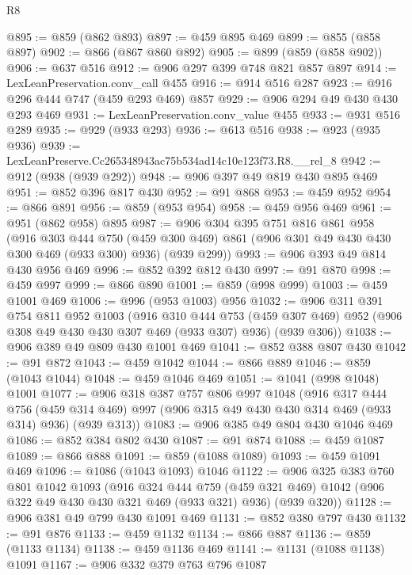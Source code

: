 \begin{lexlean}{R8}
\begin{coremodule}
@895 := @859 (@862 @893)
@897 := @459 @895 @469
@899 := @855 (@858 @897)
@902 := @866 (@867 @860 @892)
@905 := @899 (@859 (@858 @902))
@906 := @637 @516
@912 := @906 @297 @399 @748 @821 @857 @897
@914 := LexLeanPreservation.conv_call @455
@916 := @914 @516 @287
@923 := @916 @296 @444 @747 (@459 @293 @469) @857
@929 := @906 @294 @49 @430 @430 @293 @469
@931 := LexLeanPreservation.conv_value @455
@933 := @931 @516 @289
@935 := @929 (@933 @293)
@936 := @613 @516
@938 := @923 (@935 @936)
@939 := LexLeanPreserve.Cc265348943ac75b534ad14c10e123f73.R8.__rel_8
@942 := @912 (@938 (@939 @292))
@948 := @906 @397 @49 @819 @430 @895 @469
@951 := @852 @396 @817 @430
@952 := @91 @868
@953 := @459 @952
@954 := @866 @891
@956 := @859 (@953 @954)
@958 := @459 @956 @469
@961 := @951 (@862 @958) @895
@987 := @906
    @304
    @395
    @751
    @816
    @861
    @958
    (@916
      @303
      @444
      @750
      (@459 @300 @469)
      @861
      (@906 @301 @49 @430 @430 @300 @469 (@933 @300) @936)
      (@939 @299))
@993 := @906 @393 @49 @814 @430 @956 @469
@996 := @852 @392 @812 @430
@997 := @91 @870
@998 := @459 @997
@999 := @866 @890
@1001 := @859 (@998 @999)
@1003 := @459 @1001 @469
@1006 := @996 (@953 @1003) @956
@1032 := @906
    @311
    @391
    @754
    @811
    @952
    @1003
    (@916
      @310
      @444
      @753
      (@459 @307 @469)
      @952
      (@906 @308 @49 @430 @430 @307 @469 (@933 @307) @936)
      (@939 @306))
@1038 := @906 @389 @49 @809 @430 @1001 @469
@1041 := @852 @388 @807 @430
@1042 := @91 @872
@1043 := @459 @1042
@1044 := @866 @889
@1046 := @859 (@1043 @1044)
@1048 := @459 @1046 @469
@1051 := @1041 (@998 @1048) @1001
@1077 := @906
    @318
    @387
    @757
    @806
    @997
    @1048
    (@916
      @317
      @444
      @756
      (@459 @314 @469)
      @997
      (@906 @315 @49 @430 @430 @314 @469 (@933 @314) @936)
      (@939 @313))
@1083 := @906 @385 @49 @804 @430 @1046 @469
@1086 := @852 @384 @802 @430
@1087 := @91 @874
@1088 := @459 @1087
@1089 := @866 @888
@1091 := @859 (@1088 @1089)
@1093 := @459 @1091 @469
@1096 := @1086 (@1043 @1093) @1046
@1122 := @906
    @325
    @383
    @760
    @801
    @1042
    @1093
    (@916
      @324
      @444
      @759
      (@459 @321 @469)
      @1042
      (@906 @322 @49 @430 @430 @321 @469 (@933 @321) @936)
      (@939 @320))
@1128 := @906 @381 @49 @799 @430 @1091 @469
@1131 := @852 @380 @797 @430
@1132 := @91 @876
@1133 := @459 @1132
@1134 := @866 @887
@1136 := @859 (@1133 @1134)
@1138 := @459 @1136 @469
@1141 := @1131 (@1088 @1138) @1091
@1167 := @906
    @332
    @379
    @763
    @796
    @1087

\end{coremodule}
\end{lexlean}
